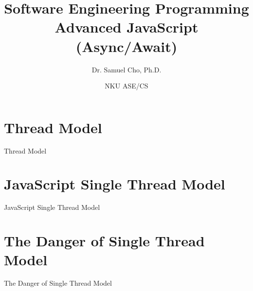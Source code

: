 \documentclass[handout, 14pt]{beamer}
\begin{document}
\title[SE Programming]{Software Engineering Programming\\Advanced JavaScript (Async/Await)}
\author{Dr. Samuel Cho, Ph.D.} 
\date{NKU ASE/CS} 

{
\begin{frame}
\titlepage
\end{frame}
}

\begin{frame}[fragile]{}
\begin{center} 
    \tableofcontents
\end{center}
\end{frame}


\def\name{Thread Model}
\section{\name}
\begin{frame}[fragile]{}%
\begin{center}%
%
%
\name
\end{center}%
\end{frame}
    


\def\name{JavaScript Single Thread Model}
\section[Single]{\name}
\begin{frame}[fragile]{}%
\begin{center}%
%
%
\name
\end{center}%
\end{frame}
 

\def\name{The Danger of Single Thread Model}
\section[Danger]{\name}
\begin{frame}[fragile]{}%
\begin{center}%
%
%
\name
\end{center}%
\end{frame}
 
\end{document}
